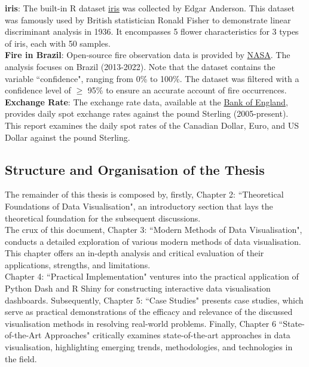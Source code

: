 \documentclass{article}\usepackage[]{graphicx}\usepackage[]{xcolor}
\begin{document}
\noindent
\textbf{iris}: The built-in R dataset \href{https://www.rdocumentation.org/packages/datasets/versions/3.6.2/topics/iris}{iris} was collected by Edgar Anderson. This dataset was famously used by British statistician Ronald Fisher to demonstrate linear discriminant analysis in 1936. It encompasses 5 flower characteristics for 3 types of iris, each with 50 samples. \\

\noindent
\textbf{Fire in Brazil}: Open-source fire observation data is provided by \href{https://firms.modaps.eosdis.nasa.gov/}{NASA}. The analysis focuses on Brazil (2013-2022). Note that the dataset contains the variable ``confidence", ranging from 0\% to 100\%. The dataset was filtered with a confidence level of $\ge$ 95\%  to ensure an accurate account of fire occurrences\cite{nasa_confidence}.\\

\noindent
\textbf{Exchange Rate}: The exchange rate data, available at the \href{https://www.bankofengland.co.uk/boeapps/database/index.asp?first=yes&SectionRequired=I&HideNums=-1&ExtraInfo=true&Travel=NIx}{Bank of England}, provides daily spot exchange rates against the pound Sterling (2005-present). This report examines the daily spot rates of the Canadian Dollar, Euro, and US Dollar against the pound Sterling.\\


\subsection{Structure and Organisation of the Thesis}

The remainder of this thesis is composed by, firstly, Chapter 2: ``Theoretical Foundations of Data Visualisation", an introductory section that lays the theoretical foundation for the subsequent discussions.\\

\noindent 
The crux of this document, Chapter 3: ``Modern Methods of Data Visualisation", conducts a detailed exploration of various modern methods of data visualisation. This chapter offers an in-depth analysis and critical evaluation of their applications, strengths, and limitations.\\

\noindent 
Chapter 4: ``Practical Implementation" ventures into the practical application of Python Dash and R Shiny for constructing interactive data visualisation dashboards. Subsequently, Chapter 5: ``Case Studies" presents case studies, which serve as practical demonstrations of the efficacy and relevance of the discussed visualisation methods in resolving real-world problems. Finally, Chapter 6 ``State-of-the-Art Approaches" critically examines state-of-the-art approaches in data visualisation, highlighting emerging trends, methodologies, and technologies in the field.
\end{document}
